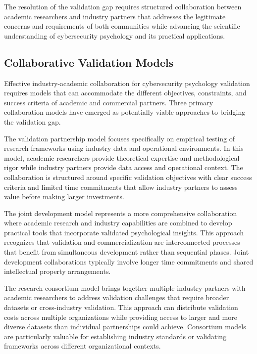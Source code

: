 \documentclass[10pt,twocolumn]{IEEEtran}
\begin{document}
The resolution of the validation gap requires structured collaboration between academic researchers and industry partners that addresses the legitimate concerns and requirements of both communities while advancing the scientific understanding of cybersecurity psychology and its practical applications.

\subsection{Collaborative Validation Models}

Effective industry-academic collaboration for cybersecurity psychology validation requires models that can accommodate the different objectives, constraints, and success criteria of academic and commercial partners. Three primary collaboration models have emerged as potentially viable approaches to bridging the validation gap.

The validation partnership model focuses specifically on empirical testing of research frameworks using industry data and operational environments. In this model, academic researchers provide theoretical expertise and methodological rigor while industry partners provide data access and operational context. The collaboration is structured around specific validation objectives with clear success criteria and limited time commitments that allow industry partners to assess value before making larger investments.

The joint development model represents a more comprehensive collaboration where academic research and industry capabilities are combined to develop practical tools that incorporate validated psychological insights. This approach recognizes that validation and commercialization are interconnected processes that benefit from simultaneous development rather than sequential phases. Joint development collaborations typically involve longer time commitments and shared intellectual property arrangements.

The research consortium model brings together multiple industry partners with academic researchers to address validation challenges that require broader datasets or cross-industry validation. This approach can distribute validation costs across multiple organizations while providing access to larger and more diverse datasets than individual partnerships could achieve. Consortium models are particularly valuable for establishing industry standards or validating frameworks across different organizational contexts.
\end{document}
